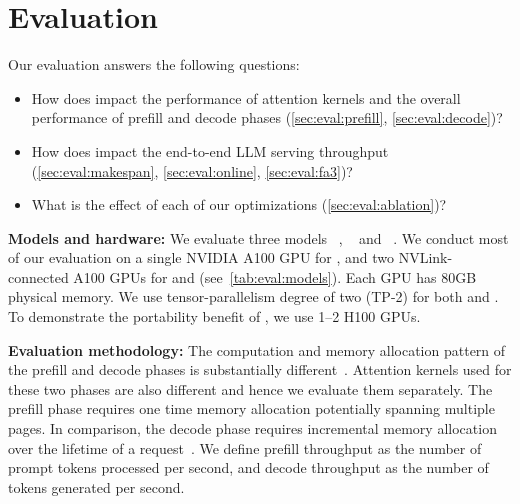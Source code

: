 \section{Evaluation}
\label{sec:evaluation}





Our evaluation answers the following questions:
\begin{itemize}
    \item How does \sysname impact the performance of attention kernels and the overall performance of prefill and decode phases (\autoref{sec:eval:prefill}, \autoref{sec:eval:decode})?
    \item How does \sysname impact the end-to-end LLM serving throughput (\autoref{sec:eval:makespan}, \autoref{sec:eval:online}, \autoref{sec:eval:fa3})?
    \item What is the effect of each of our optimizations (\autoref{sec:eval:ablation})?
\end{itemize}



\noindent
\textbf{Models and hardware:} We evaluate three models \yismall~\cite{yi-6b-200k-hf},
\llamasmall~\cite{llama-8b-hf} and \yimedium~\cite{yi-34b-200k-hf}. We conduct most of our evaluation on a single NVIDIA A100 GPU for \yismall, and two NVLink-connected A100 GPUs for \llamasmall and \yimedium (see~\autoref{tab:eval:models}). Each GPU has 80GB physical memory. We use tensor-parallelism degree of two (TP-2) for both \llamasmall and \yimedium. To demonstrate the portability benefit of \sysname, we use 1--2 H100 GPUs.


\noindent
\textbf{Evaluation methodology:} The computation and memory allocation pattern of the prefill and decode phases is substantially different~\cite{sarathiserve2024,splitfuse2024,distserve2024}. Attention kernels used for these two phases are also different and hence we evaluate them separately. The prefill phase requires one time memory allocation potentially spanning multiple pages. In comparison, the decode phase requires incremental memory allocation over the lifetime of a request~\cite{vllmsosp}. We define prefill throughput as the number of prompt tokens processed per second, and decode throughput as the number of tokens generated per second.

\begin{table}[t!]
    \centering
    \caption{Models and hardware used for evaluation.}
    \label{tab:eval:models}
\end{table}

